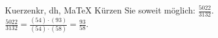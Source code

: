 \begin{MAufgabe}{Kuerzen}{kr, dh, MaTeX}
K\"urzen Sie soweit m\"oglich: $\frac{5022}{3132}$.\\ 
\ifLsg\MLoesung
\quad $\frac{5022}{3132}=\frac{(54)\cdot(93)}{(54)\cdot(58)}=\frac{93}{58}$.\else\relax\fi
 \end{MAufgabe}